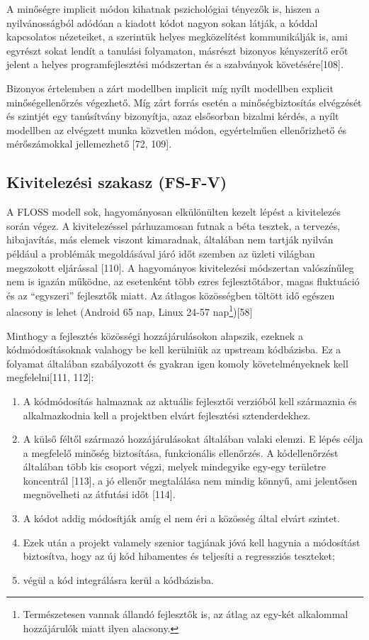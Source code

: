 \documentclass[12pt,magyar,a4paper,oneside]{scrreprt}
\providecommand{\tightlist}{%
  \setlength{\itemsep}{0pt}\setlength{\parskip}{0pt}}
\begin{document}
A minőségre implicit módon kihatnak pszichológiai tényezők is, hiszen a
nyilvánosságból adódóan a kiadott kódot nagyon sokan látják, a kóddal
kapcsolatos nézeteiket, a szerintük helyes megközelítést kommunikálják
is, ami egyrészt sokat lendít a tanulási folyamaton, másrészt bizonyos
kényszerítő erőt jelent a helyes programfejlesztési módszertan és a
szabványok követésére{[}108{]}.

Bizonyos értelemben a zárt modellben implicit míg nyílt modellben
explicit minőségellenőrzés végezhető. Míg zárt forrás esetén a
minőségbiztosítás elvégzését és szintjét egy tanúsítvány bizonyítja,
azaz elsősorban bizalmi kérdés, a nyílt modellben az elvégzett munka
közvetlen módon, egyértelműen ellenőrizhető és mérőszámokkal
jellemezhető {[}72, 109{]}.

\hypertarget{sec:FS-F-V}{%
\subsection{Kivitelezési szakasz (FS-F-V)}\label{sec:FS-F-V}}

A FLOSS modell sok, hagyományosan elkülönülten kezelt lépést a
kivitelezés során végez. A kivitelezéssel párhuzamosan futnak a béta
tesztek, a tervezés, hibajavítás, más elemek viszont kimaradnak,
általában nem tartják nyilván például a problémák megoldásával járó időt
szemben az üzleti világban megszokott eljárással {[}110{]}. A
hagyományos kivitelezési módszertan valószínűleg nem is igazán működne,
az esetenként több ezres fejlesztőtábor, magas fluktuáció és az
``egyszeri'' fejlesztők miatt. Az átlagos közösségben töltött idő
egészen alacsony is lehet (Android 65 nap, Linux 24-57 nap\footnote{Természetesen
  vannak állandó fejlesztők is, az átlag az egy-két alkalommal
  hozzájárulók miatt ilyen alacsony.}){[}58{]}

Minthogy a fejlesztés közösségi hozzájárulásokon alapszik, ezeknek a
kódmódosításoknak valahogy be kell kerülniük az upstream kódbázisba. Ez
a folyamat általában szabályozott és gyakran igen komoly
követelményeknek kell megfelelni{[}111, 112{]}:

\begin{enumerate}
\def\labelenumi{\arabic{enumi}.}
\tightlist
\item
  A kódmódosítás halmaznak az aktuális fejlesztői verzióból kell
  származnia és alkalmazkodnia kell a projektben elvárt fejlesztési
  sztenderdekhez.
\item
  A külső féltől származó hozzájárulásokat általában valaki elemzi. E
  lépés célja a megfelelő minőség biztosítása, funkcionális ellenőrzés.
  A kódellenőrzést általában több kis csoport végzi, melyek mindegyike
  egy-egy területre koncentrál {[}113{]}, a jó ellenőr megtalálása nem
  mindig könnyű, ami jelentősen megnövelheti az átfutási időt {[}114{]}.
\item
  A kódot addig módosítják amíg el nem éri a közösség által elvárt
  szintet.
\item
  Ezek után a projekt valamely szenior tagjának jóvá kell hagynia a
  módosítást biztosítva, hogy az új kód hibamentes és teljesíti a
  regressziós teszteket;
\item
  végül a kód integrálásra kerül a kódbázisba.
\end{enumerate}
\end{document}
